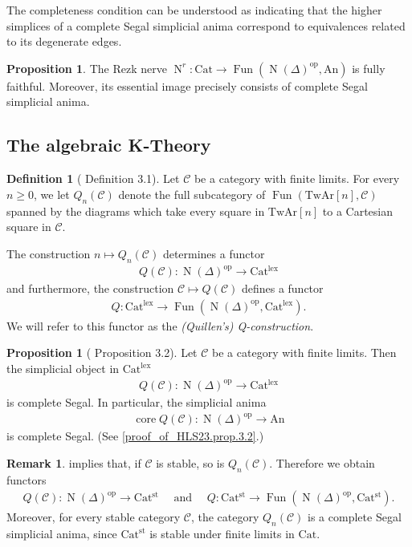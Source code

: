 \documentclass[a4paper,dvipdfmx,11pt,reqno]{amsart}
\DeclareMathOperator{\myop}{op}
\DeclareMathOperator{\N}{N}
\DeclareMathOperator{\Fun}{Fun}
\newcommand{\C}{\mathcal{C}}
\DeclareMathOperator{\core}{core}
\newcommand{\An}{\mathrm{An}}
\newcommand{\Cat}{\mathrm{Cat}}
\newcommand{\Catlex}{\mathrm{Cat^{lex}}}
\newcommand{\Catst}{\mathrm{Cat^{st}}}
\newcommand{\TwAr}{\mathrm{TwAr}}
\theoremstyle{definition}
\newtheorem{definition}[theorem]{Definition}
\newtheorem{proposition}[theorem]{Proposition}
\newtheorem{remark}[theorem]{Remark}
\begin{document}
The completeness condition can be understood as indicating that the higher simplices of a complete Segal simplicial anima correspond to equivalences related to its degenerate edges.

\begin{proposition}
  The Rezk nerve $\N^r : \Cat \to \Fun(\N(\Delta)^{\myop},\An)$ is fully faithful.
  Moreover, its essential image precisely consists of complete Segal simplicial anima.
\end{proposition}

\subsection{The algebraic K-Theory}

\begin{definition}[\cite{HLS23} Definition 3.1] \label{HLS23.def.3.1}
  Let $\C$ be a category with finite limits.
  For every $n \geq 0$, we let $Q_{n}(\C)$ denote the full subcategory of $\Fun(\TwAr[n],\C)$ spanned by the diagrams which take every square in $\TwAr[n]$ to a Cartesian square in $\C$.

  The construction $n \mapsto Q_{n}(\C)$ determines a functor 
  \begin{align*}
    Q(\C) : \N(\Delta)^{\myop} \to \Catlex
  \end{align*}
  and furthermore, the construction $\C \mapsto Q(\C)$ defines a functor 
  \begin{align*}
    Q : \Catlex \to \Fun(\N(\Delta)^{\myop},\Catlex).
  \end{align*}
  We will refer to this functor as the \textit{(Quillen's) Q-construction}.
\end{definition}

\begin{proposition}[\cite{HLS23} Proposition 3.2] \label{HLS23.prop.3.2}
  Let $\C$ be a category with finite limits.
  Then the simplicial object in $\Catlex$
  \begin{align*}
    Q(\C) : \N(\Delta)^{\myop} \to \Catlex
  \end{align*}
  is complete Segal.
  In particular, the simplicial anima 
  \begin{align*}
    \core Q(\C) : \N(\Delta)^{\myop} \to \An
  \end{align*}
  is complete Segal.
  (See \cref{proof_of_HLS23.prop.3.2}.)
\end{proposition}

\begin{remark} \label{Ber.rem.4.32}
   implies that, if $\C$ is stable, so is $Q_n(\C)$.
  Therefore we obtain functors
  \begin{align*}
    Q(\C) : \N(\Delta)^{\myop} \to \Catst 
    \quad \text{ and } \quad 
    Q : \Catst \to \Fun(\N(\Delta)^{\myop},\Catst).
  \end{align*}
  Moreover, for every stable category $\C$, the category $Q_n(\C)$ is a complete Segal simplicial anima, since $\Catst$ is stable under finite limits in $\Cat$.
\end{remark}
\end{document}
